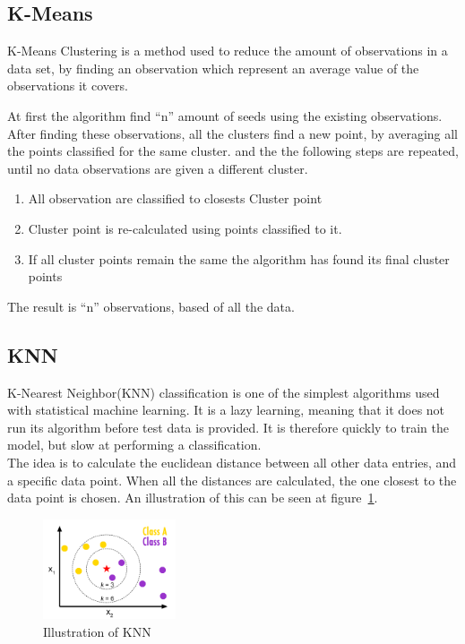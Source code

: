 \documentclass[report]{subfiles}
\begin{document}
\subsection{K-Means}
\label{sec:theorykMeans}
K-Means Clustering is a method used to reduce the amount of observations in a data set, by finding an observation which represent an average value of the observations it covers. 

At first the algorithm find ``n'' amount of seeds using the existing observations. After finding these observations, all the clusters find a new point, by averaging all the points classified for the same cluster. and the the following steps are repeated, until no data observations are given a different cluster.

\begin{enumerate}
\item All observation are classified to closests Cluster point
\item Cluster point is re-calculated using points classified to it.
\item If all cluster points remain the same the algorithm has found its final cluster points
\end{enumerate}

The result is ``n'' observations, based of all the data. 

\subsection{KNN}
\label{sec:theoryKNN}
K-Nearest Neighbor(KNN) classification is one of the simplest algorithms used with statistical machine learning. It is a lazy learning, meaning that it does not run its algorithm before test data is provided. It is therefore quickly to train the model, but slow at performing a classification.\\
The idea is to calculate the euclidean distance between all other data entries, and a specific data point. When all the distances are calculated, the one closest to the data point is chosen. An illustration of this can be seen at figure~\ref{fig:knnExp}.

\begin{figure}[H]
	\centering
	\includegraphics[width=0.35\textwidth]{images/knnExp}
	\caption{Illustration of KNN}
	\label{fig:knnExp}
\end{figure}
\end{document}
